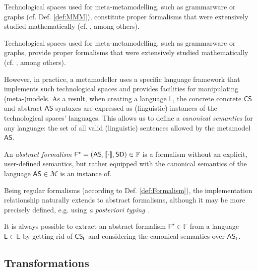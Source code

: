 \begin{olddef}
Technological spaces used for meta-metamodelling, such as grammarware or 
graphs (cf. Def. \ref{def:MMM}), constitute proper formalisms that were 
extensively studied mathematically (cf. 
\cite{B:Rozenberg:1997,B:Aho-etAl:2006}, among others).
\end{olddef}
\begin{newdef}
Technological spaces used for meta-metamodelling, such as grammarware or 
graphs, provide proper formalisms that were 
extensively studied mathematically (cf. 
\cite{B:Rozenberg:1997,B:Aho-etAl:2006}, among others).
\end{newdef}
However, in practice, a metamodeller uses a specific language 
framework that implements such technological spaces and provides facilities for 
manipulating (meta-)models. As a result, when creating a language $\mathsf{L}$,
the concrete concrete $\mathsf{CS}$ and abstract $\mathsf{AS}$ syntaxes are 
expressed as (linguistic) instances of the technological spaces' languages. 
This allows us to define a \emph{canonical semantics} for any language: the set 
of all valid (linguistic) sentences allowed by the metamodel $\mathsf{AS}$. 

\begin{Definition}
   An \emph{abstract formalism} $\mathsf{F^\star} = 
(\mathsf{AS}, \llbracket \cdot \rrbracket, \mathsf{SD}) \in\mathbb{F}$ is a formalism without an 
explicit, user-defined semantics, but rather equipped with the canonical 
semantics of the language $\mathsf{AS}\in\mathcal{M}$ is an instance of.
\end{Definition}
Being regular formalisms (according to Def. \ref{def:Formalism}), the 
implementation relationship naturally extends to abstract formalisms, although 
it may be more precisely defined, e.g. using \emph{a posteriori typing} 
\cite{J:deLara-Guerra:2017}.

It is always possible to extract an abstract formalism  
$\mathsf{F^\star}\in\mathbb{F}$ from a language $\mathsf{L}\in\mathbb{L}$ by 
getting rid of $\mathsf{CS}_{\mathsf{L}}$ and considering the canonical 
semantics over $\mathsf{AS}_{\mathsf{L}}$.

\subsection{Transformations}
\label{sec:Formalisation-Transformation}

